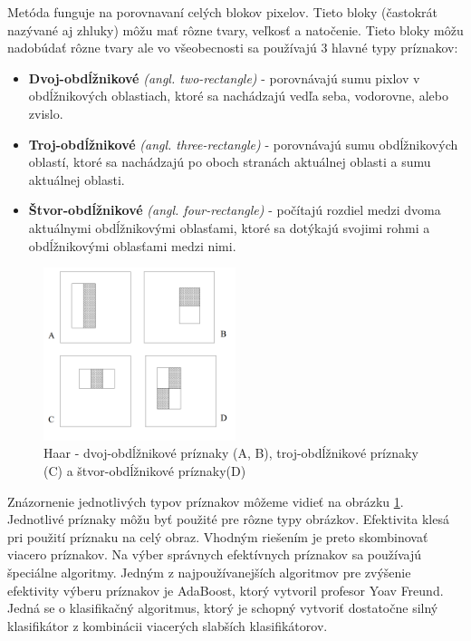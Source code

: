 \documentclass[slovak,master,dept460,male,cpp,cpdeclaration]{diploma}
\begin{document}
 Metóda funguje na porovnavaní celých blokov pixelov. Tieto bloky (častokrát nazývané aj zhluky) môžu mať rôzne tvary, veľkosť a natočenie. Tieto bloky môžu nadobúdať rôzne tvary ale vo všeobecnosti sa používajú 3 hlavné typy príznakov:
\begin{itemize}
  \item \textbf{Dvoj-obdĺžnikové} \textit{(angl. two-rectangle)} - porovnávajú sumu pixlov v obdĺžnikových oblastiach, ktoré sa nachádzajú vedľa seba, vodorovne, alebo zvislo.
  \item \textbf{Troj-obdĺžnikové} \textit{(angl. three-rectangle)} - porovnávajú sumu obdĺžnikových oblastí, ktoré sa nachádzajú po oboch stranách aktuálnej oblasti a sumu aktuálnej oblasti.
  \item \textbf{Štvor-obdĺžnikové} \textit{(angl. four-rectangle)} - počítajú rozdiel medzi dvoma aktuálnymi obdĺžnikovými oblasťami, ktoré sa dotýkajú svojimi rohmi a obdĺžnikovými oblasťami medzi nimi.
  
 \end{itemize}
   \begin{figure}[H]
	\centering
	\includegraphics[width=0.5\textwidth]{Figures/haar1.png}
	\caption{Haar - dvoj-obdĺžnikové príznaky (A, B), troj-obdĺžnikové príznaky (C) a štvor-obdĺžnikové príznaky(D)\cite{viola2001robust}}
	\label{fig:Haar1}
\end{figure}
  Znázornenie jednotlivých typov príznakov môžeme vidieť na obrázku \ref{fig:Haar1}. Jednotlivé príznaky môžu byť použité pre rôzne typy obrázkov. Efektivita klesá pri použití príznaku na celý obraz. Vhodným riešením je preto skombinovať viacero príznakov. Na výber  správnych efektívnych príznakov sa používajú špeciálne algoritmy. Jedným z najpoužívanejších algoritmov  pre zvýšenie efektivity výberu príznakov je AdaBoost\cite{freund1995desicion}, ktorý vytvoril profesor Yoav Freund. Jedná se o klasifikačný algoritmus, ktorý je schopný vytvoriť dostatočne silný klasifikátor z kombinácii viacerých slabších klasifikátorov. 
\end{document}
